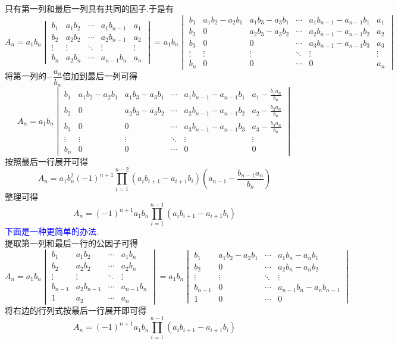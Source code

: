\documentclass{ctexart}
\begin{document}
\begin{solution}
    只有第一列和最后一列具有共同的因子.于是有
    \[A_n=a_1b_n\begin{vmatrix}
        b_1&a_1b_2&\cdots&a_1b_{n-1}&a_1\\
        b_2&a_2b_2&\cdots&a_2b_{n-1}&a_2\\
        \vdots&\vdots&\ddots&\vdots&\vdots\\
        b_n&a_2b_n&\cdots&a_{n-1}b_n&a_n
    \end{vmatrix}=a_1b_n\begin{vmatrix}
        b_1&a_1b_2-a_2b_1&a_1b_3-a_3b_1&\cdots&a_1b_{n-1}-a_{n-1}b_1&a_1\\
        b_2&0&a_2b_3-a_3b_2&\cdots&a_2b_{n-1}-a_{n-1}b_2&a_2\\
        b_3&0&0&\cdots&a_3b_{n-1}-a_{n-1}b_3&a_3\\
        \vdots&\vdots&\vdots&\ddots&\vdots&\vdots\\
        b_n&0&0&\cdots&0&a_n
    \end{vmatrix}\]
    将第一列的$-\dfrac{a_n}{b_n}$倍加到最后一列可得
    \[A_n=a_1b_n\begin{vmatrix}
        b_1&a_1b_2-a_2b_1&a_1b_3-a_3b_1&\cdots&a_1b_{n-1}-a_{n-1}b_1&a_1-\frac{b_1a_n}{b_n}\\
        b_2&0&a_2b_3-a_3b_2&\cdots&a_2b_{n-1}-a_{n-1}b_2&a_2-\frac{b_2a_n}{b_n}\\
        b_3&0&0&\cdots&a_3b_{n-1}-a_{n-1}b_3&a_3-\frac{b_3a_n}{b_n}\\
        \vdots&\vdots&\vdots&\ddots&\vdots&\vdots\\
        b_n&0&0&\cdots&0&0
    \end{vmatrix}\]
    按照最后一行展开可得
    \[A_n=a_1b_n^2(-1)^{n+1}\prod_{i=1}^{n-2}\left(a_ib_{i+1}-a_{i+1}b_i\right)\left(a_{n-1}-\dfrac{b_{n-1}a_n}{b_n}\right)\]
    整理可得
    \[A_n=(-1)^{n+1}a_1b_n\prod_{i=1}^{n-1}\left(a_ib_{i+1}-a_{i+1}b_i\right)\]
    \textcolor{blue}{下面是一种更简单的办法.}\\
    提取第一列和最后一行的公因子可得
    \[A_n=a_1b_n\begin{vmatrix}
        b_1&a_1b_2&\cdots&a_1b_n\\
        b_2&a_2b_2&\cdots&a_2b_n\\
        \vdots&\vdots&\ddots&\vdots\\
        b_{n-1}&a_2b_{n-1}&\cdots&a_{n-1}b_n\\
        1&a_2&\cdots&a_n
    \end{vmatrix}=a_1b_n\begin{vmatrix}
        b_1&a_1b_2-a_2b_1&\cdots&a_1b_n-a_nb_1\\
        b_2&0&\cdots&a_2b_n-a_nb_2\\
        \vdots&\vdots&\ddots&\vdots\\
        b_{n-1}&0&\cdots&a_{n-1}b_n-a_nb_{n-1}\\
        1&0&\cdots&0
    \end{vmatrix}\]
    将右边的行列式按最后一行展开即可得
    \[A_n=(-1)^{n+1}a_1b_n\prod_{i=1}^{n-1}\left(a_ib_{i+1}-a_{i+1}b_i\right)\]
\end{solution}
\end{document}
